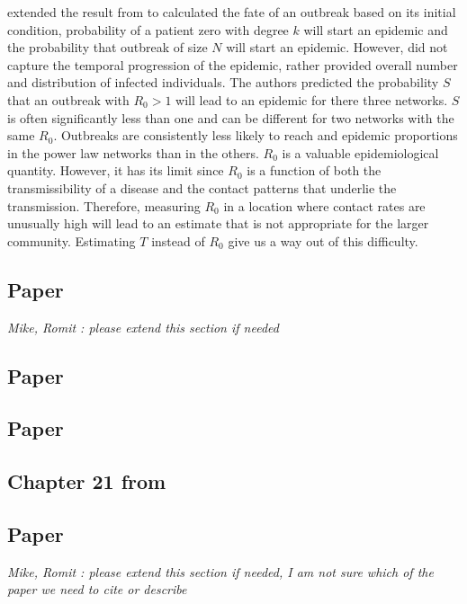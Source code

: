 \documentclass[12pt, journal,onecolumn]{IEEEtran}
\begin{document}
 \cite{meyers2005network} extended the result from \cite{newman2002spread} to calculated the fate of an outbreak based on its initial condition, probability of a patient zero with degree $k$ will start an epidemic and the probability that outbreak of size $N$ will start an epidemic. However, \cite{newman2002spread} did not capture the temporal progression of the epidemic, rather provided overall number and distribution of infected individuals. The authors predicted the probability $S$ that an outbreak with $R_0>1$ will lead to an epidemic for there three networks. $S$ is often significantly less than one and can be different for two networks with the same $R_0$. Outbreaks are consistently less likely to reach and epidemic proportions in the power law networks than in the others. $R_0$ is a valuable epidemiological quantity. However, it has its limit since $R_0$ is a function of both the transmissibility of a disease and the contact patterns that underlie the transmission. Therefore, measuring $R_0$ in a location where contact rates are unusually high will lead to an estimate that is not appropriate for the larger community.  Estimating $T$ instead of $R_0$ give us a way out of this difficulty.


\subsection{Paper \cite{keeling2005networks}}


\bigskip 
{\em{Mike, Romit : please extend this section if needed}}


\subsection{Paper \cite{meltzer2014estimating}}
\subsection{Paper \cite{myers2012information}}
\subsection{Chapter 21 from \cite{easley2010networks}}

\subsection{Paper \cite{newman2002spread}}

\bigskip
{\em{Mike, Romit : please extend this section if needed, I am not sure which of the paper we need to cite or describe}}
\end{document}

